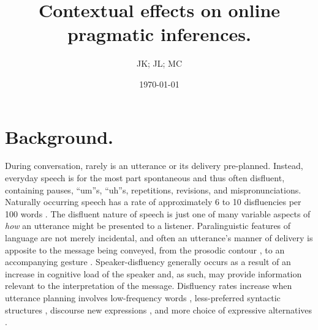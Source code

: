 \documentclass[man]{apa6}
\begin{document}
\title{Contextual effects on online pragmatic inferences.}
\author{JK; JL; MC}
\date{\today}
\maketitle

\section{Background.}
During conversation, rarely is an utterance or its delivery pre-planned. 
Instead, everyday speech is for the most part spontaneous and thus often disfluent, containing pauses, ``um''s, ``uh''s, repetitions, revisions, and mispronunciations. 
Naturally occurring speech has a rate of approximately 6 to 10 disfluencies per 100 words \citep{Bortfeld2001, FoxTree1995}. 
The disfluent nature of speech is just one of many variable aspects of \textit{how} an utterance might be presented to a listener. 
Paralinguistic features of language are not merely incidental, and often an utterance's manner of delivery is apposite to the message being conveyed, from the prosodic contour \citep{Fernald1991}, to an accompanying gesture \citep{Alibali2001}. 
Speaker-disfluency generally occurs as a result of an increase in cognitive load of the speaker \citep{Bortfeld2001, Goldman-Eisler1968} and, as such, may provide information relevant to the interpretation of the message. 
Disfluency rates increase when utterance planning involves low-frequency words \citep{Beattie1979}, less-preferred syntactic structures \citep{Cook2009}, discourse new expressions \citep{Arnold2003}, and more choice of expressive alternatives \citep{Schachter1991}. 
\end{document}
